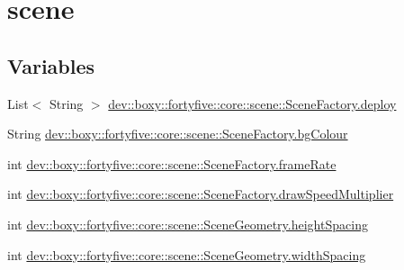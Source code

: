 \hypertarget{group__scene}{
\section{scene}
\label{db/dac/group__scene}
}
\subsection*{Variables}
\begin{DoxyCompactItemize}
\item 
List$<$ String $>$ \hyperlink{group__scene_ga4dd990306b73a11f8919577de81612c0}{dev::boxy::fortyfive::core::scene::SceneFactory.deploy}
\item 
String \hyperlink{group__scene_gaba03aa65939f5ac2c4bfac931088a26e}{dev::boxy::fortyfive::core::scene::SceneFactory.bgColour}
\item 
int \hyperlink{group__scene_ga8d80f585cc4c2089e31b55e12085fcbd}{dev::boxy::fortyfive::core::scene::SceneFactory.frameRate}
\item 
int \hyperlink{group__scene_ga1842bb351dbdbb9eab2700adb61ac322}{dev::boxy::fortyfive::core::scene::SceneFactory.drawSpeedMultiplier}
\end{DoxyCompactItemize}
\begin{DoxyCompactItemize}
\item 
int \hyperlink{group__scene_ga8b7cd33813c77386f79af2e54ba7ed34}{dev::boxy::fortyfive::core::scene::SceneGeometry.heightSpacing}
\item 
int \hyperlink{group__scene_ga8116f4feebb544338d5cb2bb2f069cba}{dev::boxy::fortyfive::core::scene::SceneGeometry.widthSpacing}
\end{DoxyCompactItemize}


